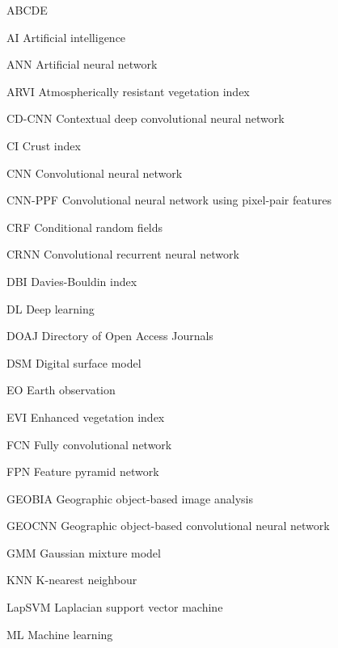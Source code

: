 
\begin{seznamzkratek}{ABCDE}

	      {AI}
	      {Artificial intelligence}

	      {ANN}
	      {Artificial neural network}

	      {ARVI}
	      {Atmospherically resistant vegetation index}

	      {CD-CNN}
	      {Contextual deep convolutional neural network}

	      {CI}
	      {Crust index}

	      {CNN}
	      {Convolutional neural network}

	      {CNN-PPF}
	      {Convolutional neural network using pixel-pair features}

	      {CRF}
	      {Conditional random fields}

	      {CRNN}
	      {Convolutional recurrent neural network}

	      {DBI}
	      {Davies-Bouldin index}

	      {DL}
	      {Deep learning}

	      {DOAJ}
	      {Directory of Open Access Journals}

	      {DSM}
	      {Digital surface model}

	      {EO}
	      {Earth observation}

	      {EVI}
	      {Enhanced vegetation index}

	      {FCN}
	      {Fully convolutional network}

	      {FPN}
	      {Feature pyramid network}

	      {GEOBIA}
	      {Geographic object-based image analysis}

	      {GEOCNN}
	      {Geographic object-based convolutional neural network}

	      {GMM}
	      {Gaussian mixture model}

	      {KNN}
	      {K-nearest neighbour}

	      {LapSVM}
	      {Laplacian support vector machine}

	      {ML}
	      {Machine learning}


\end{seznamzkratek}

